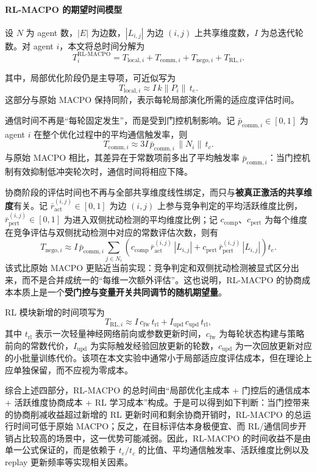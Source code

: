 \documentclass[12pt]{ctexart}
\begin{document}
\paragraph{RL-MACPO 的期望时间模型}
设 $N$ 为 agent 数，$|E|$ 为边数，$|L_{i,j}|$ 为边 $(i,j)$ 上共享维度数，$I$ 为总迭代轮数。对 agent $i$，本文将总时间分解为
\[
T_i^{\mathrm{RL\mbox{-}MACPO}}
=
T_{\mathrm{local},i}
+ 
T_{\mathrm{comm},i}
+ 
T_{\mathrm{nego},i}
+ 
T_{\mathrm{RL},i}.
\]

其中，局部优化阶段仍是主导项，可近似写为
\[
T_{\mathrm{local},i}
\approx
I\,k\lVert P_i\rVert\, t_e.
\]
这部分与原始 MACPO 保持同阶，表示每轮局部演化所需的适应度评估时间。

通信时间不再是“每轮固定发生”，而是受到门控机制影响。记 $\bar p_{\mathrm{comm},i}\in[0,1]$ 为 agent $i$ 在整个优化过程中的平均通信触发率，则
\[
T_{\mathrm{comm},i}
\approx
3I\,\bar p_{\mathrm{comm},i}\,\lVert N_i\rVert\, t_c.
\]
与原始 MACPO 相比，其差异在于常数项前多出了平均触发率 $\bar p_{\mathrm{comm},i}$：当门控机制有效抑制低冲突轮次时，通信时间将相应下降。

协商阶段的评估时间也不再与全部共享维度线性绑定，而只与\textbf{被真正激活的共享维度}有关。记 $\bar r_{\mathrm{act}}^{(i,j)}\in[0,1]$ 为边 $(i,j)$ 上参与竞争判定的平均活跃维度比例，$\bar r_{\mathrm{pert}}^{(i,j)}\in[0,1]$ 为进入双侧扰动检测的平均维度比例；记 $c_{\mathrm{comp}}$、$c_{\mathrm{pert}}$ 为每个维度在竞争评估与双侧扰动检测中对应的常数评估次数，则有
\[
T_{\mathrm{nego},i}
\approx
I\,\bar p_{\mathrm{comm},i}
\sum_{j\in N_i}
\left(
 c_{\mathrm{comp}}\,\bar r_{\mathrm{act}}^{(i,j)}\,|L_{i,j}|
 +
 c_{\mathrm{pert}}\,\bar r_{\mathrm{pert}}^{(i,j)}\,|L_{i,j}|
\right)t_e.
\]
该式比原始 MACPO 更贴近当前实现：竞争判定和双侧扰动检测被显式区分出来，而不是合并成统一的“每维一次额外评估”。这也说明，RL-MACPO 的协商成本本质上是一个\textbf{受门控与变量开关共同调节的随机期望量}。

RL 模块新增的时间项写为
\[
T_{\mathrm{RL},i}
\approx
I\,c_{\mathrm{fw}}\,t_{\mathrm{rl}}
+ 
I_{\mathrm{upd}}\,c_{\mathrm{upd}}\,t_{\mathrm{rl}},
\]
其中 $t_{\mathrm{rl}}$ 表示一次轻量神经网络前向或参数更新时间，$c_{\mathrm{fw}}$ 为每轮状态构建与策略前向的常数代价，$I_{\mathrm{upd}}$ 为实际触发经验回放更新的轮数，$c_{\mathrm{upd}}$ 为一次回放更新对应的小批量训练代价。该项在本文实验中通常小于局部适应度评估成本，但在理论上应单独保留，而不应视为零成本。

综合上述四部分，RL-MACPO 的总时间由“局部优化主成本 + 门控后的通信成本 + 活跃维度协商成本 + RL 学习成本”构成。于是可以得到如下判断：当门控带来的协商削减收益超过新增的 RL 更新时间和剩余协商开销时，RL-MACPO 的总运行时间可低于原始 MACPO；反之，在目标评估本身极便宜、而 RL/通信同步开销占比较高的场景中，这一优势可能减弱。因此，RL-MACPO 的时间收益不是由单一公式保证的，而是依赖于 $t_e/t_c$ 的比值、平均通信触发率、活跃维度比例以及 replay 更新频率等实现相关因素。
\end{document}
